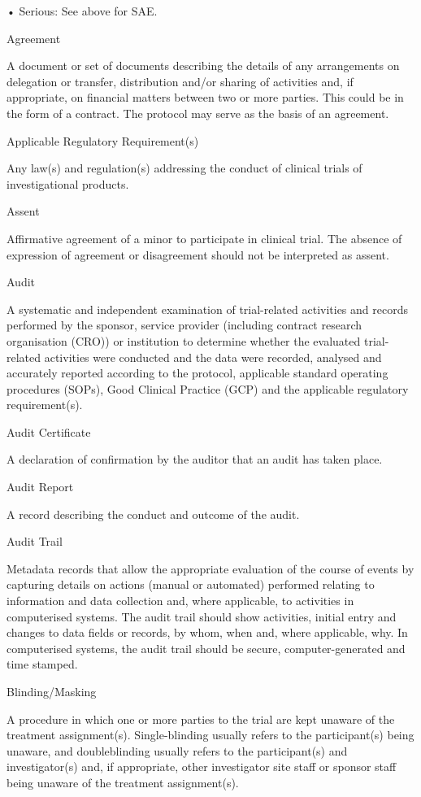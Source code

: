 \documentclass[11pt]{article}
\begin{document}
• Serious: See above for SAE.


Agreement


A document or set of documents describing the details of any arrangements on delegation or transfer, distribution and/or sharing of activities and, if appropriate, on financial matters between two or more parties. This could be in the form of a contract. The protocol may serve as the basis of an agreement.


Applicable Regulatory Requirement(s)


Any law(s) and regulation(s) addressing the conduct of clinical trials of investigational products.


Assent


Affirmative agreement of a minor to participate in clinical trial. The absence of expression of agreement or disagreement should not be interpreted as assent.


Audit


A systematic and independent examination of trial-related activities and records performed by the sponsor, service provider (including contract research organisation (CRO)) or institution to determine whether the evaluated trial-related activities were conducted and the data were recorded, analysed and accurately reported according to the protocol, applicable standard operating procedures (SOPs), Good Clinical Practice (GCP) and the applicable regulatory requirement(s).


Audit Certificate


A declaration of confirmation by the auditor that an audit has taken place.


Audit Report


A record describing the conduct and outcome of the audit.


Audit Trail


Metadata records that allow the appropriate evaluation of the course of events by capturing details on actions (manual or automated) performed relating to information and data collection and, where applicable, to activities in computerised systems. The audit trail should show activities, initial entry and changes to data fields or records, by whom, when and, where applicable, why. In computerised systems, the audit trail should be secure, computer-generated and time stamped.


Blinding/Masking


A procedure in which one or more parties to the trial are kept unaware of the treatment assignment(s). Single-blinding usually refers to the participant(s) being unaware, and doubleblinding usually refers to the participant(s) and investigator(s) and, if appropriate, other investigator site staff or sponsor staff being unaware of the treatment assignment(s).
\end{document}
